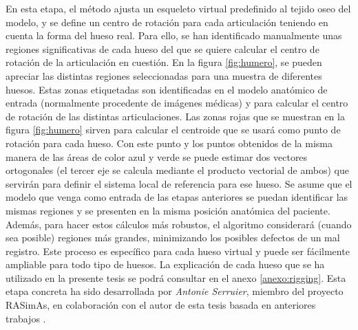 En esta etapa, el método ajusta un esqueleto virtual predefinido al tejido oseo del modelo, y se define un centro de rotación para cada articulación teniendo en cuenta la forma del hueso real.
Para ello, se han identificado manualmente unas regiones significativas de cada hueso del que se quiere calcular el centro de rotación de la articulación en cuestión. En la figura \ref{fig:humero}, se pueden apreciar las distintas regiones seleccionadas para una muestra de diferentes huesos.
Estas zonas etiquetadas son identificadas en el modelo anatómico de entrada (normalmente procedente de imágenes médicas) y   para calcular el centro de rotación de las distintas articulaciones. Las zonas rojas que se muestran en la figura \ref{fig:humero} sirven para calcular el centroide que se usará como punto de rotación para cada hueso. Con este punto y los puntos obtenidos de la misma manera de las áreas de color azul y verde se puede estimar dos vectores ortogonales (el tercer eje se calcula mediante el producto vectorial de ambos) que servirán para definir el sistema local de referencia para ese hueso.
Se asume que el modelo que venga como entrada de las etapas anteriores se puedan identificar las mismas regiones y se presenten en la misma posición anatómica del paciente. Además, para hacer estos cálculos más robustos, el algoritmo considerará (cuando sea posible) regiones más grandes, minimizando los posibles defectos de un mal registro. Este proceso es específico para cada hueso virtual y puede ser fácilmente ampliable para todo tipo de huesos. La explicación de cada hueso que se ha utilizado en la presente tesis se podrá consultar en el anexo \ref{anexo:rigging}. 
Esta etapa concreta ha sido desarrollada por \emph{Antonie Serruier}, miembro del proyecto \ac{RASimAs}, en colaboración con el autor de esta tesis basada en anteriores trabajos \cite{QUIJANO20131703}.

